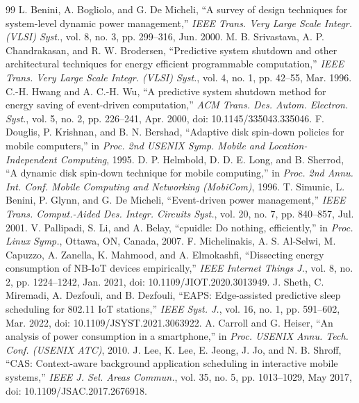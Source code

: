 \documentclass[journal]{IEEEtran}
\begin{document}
\balance
\begin{thebibliography}{99}
 L. Benini, A. Bogliolo, and G. De Micheli, ``A survey of design techniques for system-level dynamic power management,'' \emph{IEEE Trans. Very Large Scale Integr. (VLSI) Syst.}, vol. 8, no. 3, pp. 299--316, Jun. 2000.
 M. B. Srivastava, A. P. Chandrakasan, and R. W. Brodersen, ``Predictive system shutdown and other architectural techniques for energy efficient programmable computation,'' \emph{IEEE Trans. Very Large Scale Integr. (VLSI) Syst.}, vol. 4, no. 1, pp. 42--55, Mar. 1996.
 C.-H. Hwang and A. C.-H. Wu, ``A predictive system shutdown method for energy saving of event-driven computation,'' \emph{ACM Trans. Des. Autom. Electron. Syst.}, vol. 5, no. 2, pp. 226--241, Apr. 2000, doi: 10.1145/335043.335046.
 F. Douglis, P. Krishnan, and B. N. Bershad, ``Adaptive disk spin-down policies for mobile computers,'' in \emph{Proc. 2nd USENIX Symp. Mobile and Location-Independent Computing}, 1995.
 D. P. Helmbold, D. D. E. Long, and B. Sherrod, ``A dynamic disk spin-down technique for mobile computing,'' in \emph{Proc. 2nd Annu. Int. Conf. Mobile Computing and Networking (MobiCom)}, 1996.
 T. Simunic, L. Benini, P. Glynn, and G. De Micheli, ``Event-driven power management,'' \emph{IEEE Trans. Comput.-Aided Des. Integr. Circuits Syst.}, vol. 20, no. 7, pp. 840--857, Jul. 2001.
 V. Pallipadi, S. Li, and A. Belay, ``cpuidle: Do nothing, efficiently,'' in \emph{Proc. Linux Symp.}, Ottawa, ON, Canada, 2007.
 F. Michelinakis, A. S. Al-Selwi, M. Capuzzo, A. Zanella, K. Mahmood, and A. Elmokashfi, ``Dissecting energy consumption of NB-IoT devices empirically,'' \emph{IEEE Internet Things J.}, vol. 8, no. 2, pp. 1224--1242, Jan. 2021, doi: 10.1109/JIOT.2020.3013949.
 J. Sheth, C. Miremadi, A. Dezfouli, and B. Dezfouli, ``EAPS: Edge-assisted predictive sleep scheduling for 802.11 IoT stations,'' \emph{IEEE Syst. J.}, vol. 16, no. 1, pp. 591--602, Mar. 2022, doi: 10.1109/JSYST.2021.3063922.
 A. Carroll and G. Heiser, ``An analysis of power consumption in a smartphone,'' in \emph{Proc. USENIX Annu. Tech. Conf. (USENIX ATC)}, 2010.
 J. Lee, K. Lee, E. Jeong, J. Jo, and N. B. Shroff, ``CAS: Context-aware background application scheduling in interactive mobile systems,'' \emph{IEEE J. Sel. Areas Commun.}, vol. 35, no. 5, pp. 1013--1029, May 2017, doi: 10.1109/JSAC.2017.2676918.

\end{thebibliography}
\end{document}
